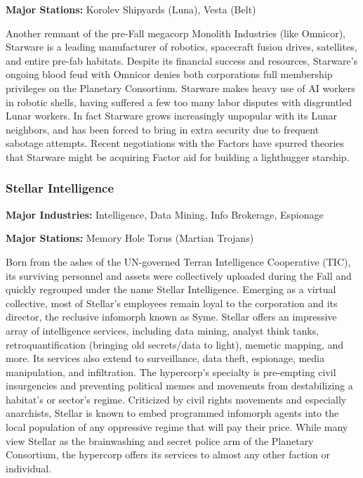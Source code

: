 \textbf{Major Stations:} Korolev Shipyards (Luna), Vesta (Belt) 

 Another remnant of the pre-Fall megacorp Monolith Industries (like Omnicor), Starware is a leading manufacturer of robotics, spacecraft fusion drives, satellites, and entire pre-fab habitats. Despite its financial success and resources, Starware's ongoing blood feud with Omnicor denies both corporations full membership privileges on the Planetary Consortium. Starware makes heavy use of AI workers in robotic shells, having suffered a few too many labor disputes with disgruntled Lunar workers. In fact Starware grows increasingly unpopular with its Lunar neighbors, and has been forced to bring in extra security due to frequent sabotage attempts. Recent negotiations with the Factors have spurred theories that Starware might be acquiring Factor aid for building a lighthugger starship. 

\subsubsection{Stellar Intelligence}
\label{sec:stellar-intelligence} 

\textbf{Major Industries:} Intelligence, Data Mining, Info Brokerage, Espionage 

\textbf{Major Stations:} Memory Hole Torus (Martian Trojans) 

 Born from the ashes of the UN-governed Terran Intelligence Cooperative (TIC), its surviving personnel and assets were collectively uploaded during the Fall and quickly regrouped under the name Stellar Intelligence. Emerging as a virtual collective, most of Stellar's employees remain loyal to the corporation and its director, the reclusive infomorph known as Syme. Stellar offers an impressive array of intelligence services, including data mining, analyst think tanks, retroquantification (bringing old secrets/data to light), memetic mapping, and more. Its services also extend to surveillance, data theft, espionage, media manipulation, and infiltration. The hypercorp's specialty is pre-empting civil insurgencies and preventing political memes and movements from destabilizing a habitat's or sector's regime. Criticized by civil rights movements and especially anarchists, Stellar is known to embed programmed infomorph agents into the local population of any oppressive regime that will pay their price. While many view Stellar as the brainwashing and secret police arm of the Planetary Consortium, the hypercorp offers its services to almost any other faction or individual. 

